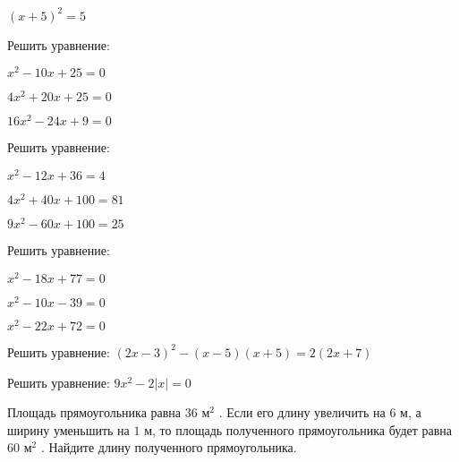 \begin{class}[number=1]
\begin{listofex}
\begin{enumcols}[itemcolumns=2]
			\item \( (x+5)^2=5 \)
		\end{enumcols}
		\item Решить уравнение:
		\begin{enumcols}[itemcolumns=3]
			\item \( x^2-10x+25=0 \)
			\item \( 4x^2+20x+25=0 \)
			\item \( 16x^2-24x+9=0 \)
		\end{enumcols}
		\item Решить уравнение:
		\begin{enumcols}[itemcolumns=3]
			\item \( x^2-12x+36=4 \)
			\item \( 4x^2+40x+100=81 \)
			\item \( 9x^2-60x+100=25 \)
		\end{enumcols}
		\item Решить уравнение:
		\begin{enumcols}[itemcolumns=3]
			\item \( x^2-18x+77=0 \)
			\item \( x^2-10x-39=0 \)
			\item \( x^2-22x+72=0 \)
		\end{enumcols}
		\item Решить уравнение: \( (2x-3)^2-(x-5)(x+5)=2(2x+7) \)
		\item Решить уравнение: \( 9x^2-2|x|=0 \)
		\item Площадь прямоугольника равна \( 36 \) м\( ^2 \) . Если его длину увеличить на \( 6 \) м, а ширину уменьшить на \( 1 \) м, то площадь полученного прямоугольника будет равна \( 60 \) м\( ^2 \) . Найдите длину полученного прямоугольника.
	\end{listofex}
\end{class}
%
%
